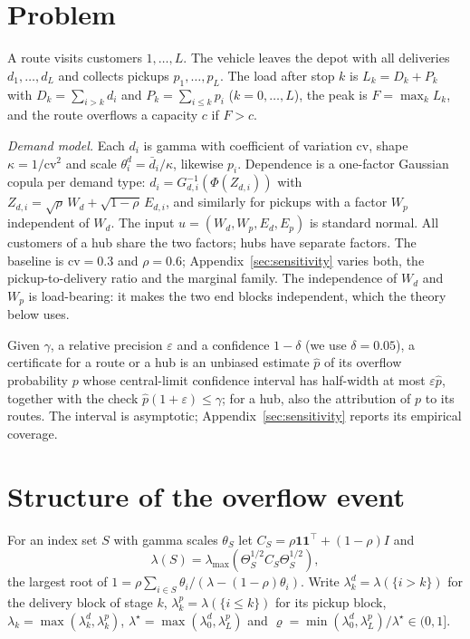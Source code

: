 \documentclass[ijoc,sglanonrev]{informs4}
\begin{document}
\section{Problem}
\label{sec:problem}

A route visits customers $1,\dots,L$. The vehicle leaves the depot with all
deliveries $d_1,\dots,d_L$ and collects pickups $p_1,\dots,p_L$. The load after
stop $k$ is $L_k = D_k + P_k$ with $D_k = \sum_{i>k} d_i$ and
$P_k = \sum_{i\le k} p_i$ ($k=0,\dots,L$), the peak is $F = \max_k L_k$, and
the route overflows a capacity $c$ if $F > c$.

\emph{Demand model.} Each $d_i$ is gamma with coefficient of variation cv,
shape $\kappa = 1/\mathrm{cv}^2$ and scale $\theta^d_i = \bar d_i/\kappa$,
likewise $p_i$. Dependence is a one-factor Gaussian copula per demand type:
$d_i = G_{d,i}^{-1}(\Phi(Z_{d,i}))$ with
$Z_{d,i} = \sqrt{\rho}\,W_d + \sqrt{1-\rho}\,E_{d,i}$, and similarly for
pickups with a factor $W_p$ independent of $W_d$. The input
$u = (W_d, W_p, E_d, E_p)$ is standard normal. All customers of a hub share the
two factors; hubs have separate factors. The baseline is $\mathrm{cv}=0.3$ and
$\rho=0.6$; Appendix~\ref{sec:sensitivity} varies both, the pickup-to-delivery
ratio and the marginal family. The independence of $W_d$ and $W_p$ is
load-bearing: it makes the two end blocks independent, which the theory below
uses.

\begin{definition}[Certificate]
Given $\gamma$, a relative precision $\varepsilon$ and a confidence $1-\delta$
(we use $\delta=0.05$), a certificate for a route or a hub is an unbiased
estimate $\hat p$ of its overflow probability $p$ whose central-limit
confidence interval has half-width at most $\varepsilon\hat p$, together with
the check $\hat p(1+\varepsilon) \le \gamma$; for a hub, also the attribution of
$p$ to its routes. The interval is asymptotic; Appendix~\ref{sec:sensitivity}
reports its empirical coverage.
\end{definition}

\section{Structure of the overflow event}
\label{sec:structure}

For an index set $S$ with gamma scales $\theta_S$ let
$C_S = \rho\mathbf{1}\mathbf{1}^\top + (1-\rho)I$ and
\[
\lambda(S) = \lambda_{\max}\!\left(\Theta_S^{1/2} C_S \Theta_S^{1/2}\right),
\]
the largest root of $1 = \rho\sum_{i\in S}\theta_i/(\lambda-(1-\rho)\theta_i)$.
Write $\lambda^d_k = \lambda(\{i>k\})$ for the delivery block of stage $k$,
$\lambda^p_k = \lambda(\{i\le k\})$ for its pickup block,
$\lambda_k = \max(\lambda^d_k,\lambda^p_k)$,
$\lambda^\star = \max(\lambda^d_0,\lambda^p_L)$ and
$\varrho = \min(\lambda^d_0,\lambda^p_L)/\lambda^\star \in (0,1]$.
\end{document}
